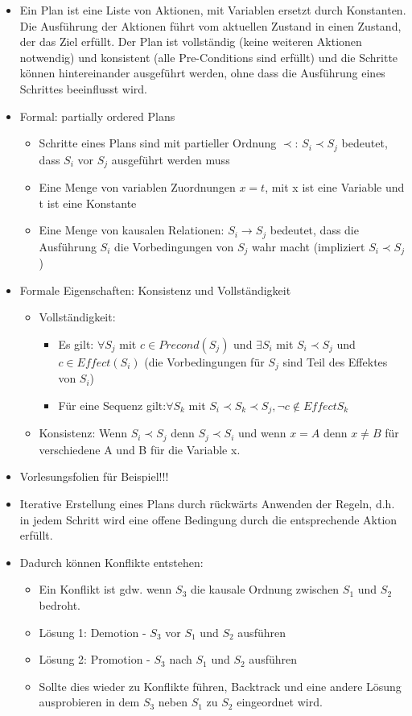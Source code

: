 \documentclass{article} %
\begin{document}
\begin{itemize}
\begin{itemize}
		\end{itemize}
		\item Ein Plan ist eine Liste von Aktionen, mit Variablen ersetzt durch Konstanten. Die Ausführung der Aktionen führt vom aktuellen Zustand in einen Zustand, der das Ziel erfüllt. Der Plan ist vollständig (keine weiteren Aktionen notwendig) und konsistent (alle Pre-Conditions sind erfüllt) und die Schritte können hintereinander ausgeführt werden, ohne dass die Ausführung eines Schrittes beeinflusst wird.
		\item Formal: partially ordered Plans
		\begin{itemize}
			\item Schritte eines Plans sind mit partieller Ordnung $\prec$: $S_{i} \prec S_{j}$ bedeutet, dass $S_{i}$ vor $S_{j}$ ausgeführt werden muss
			\item Eine Menge von variablen Zuordnungen $x=t$, mit x ist eine Variable und t ist eine Konstante
			\item Eine Menge von kausalen Relationen: $S_{i} \rightarrow S_{j}$ bedeutet, dass die Ausführung $S_{i}$ die Vorbedingungen von $S_{j}$ wahr macht (impliziert  $S_{i} \prec S_{j}$)
		\end{itemize}
		\item Formale Eigenschaften: Konsistenz und Vollständigkeit
		\begin{itemize}
			\item Vollständigkeit: 
			\begin{itemize}
				\item Es gilt: $\forall S_{j}$ mit $c\in Precond(S_{j})$ und $\exists S_{i}$ mit $S_{i} \prec S_{j}$ und $c\in Effect(S_{i})$ (die Vorbedingungen für $S_{j}$ sind Teil des Effektes von $S_{i}$)
				\item Für eine Sequenz gilt:$\forall S_{k}$ mit $S_{i} \prec S_{k} \prec S_{j}, \neg c \notin Effect S_{k}$
			\end{itemize} 
			\item Konsistenz: Wenn $S_{i} \prec S_{j}$ denn $S_{j} \prec S_{i}$ und wenn $x=A$ denn $x \neq B$ für verschiedene A und B für die Variable x.
		\end{itemize}
		\item Vorlesungsfolien für Beispiel!!!
		\item Iterative Erstellung eines Plans durch rückwärts Anwenden der Regeln, d.h. in jedem Schritt wird eine offene Bedingung durch die entsprechende Aktion erfüllt.
		\item Dadurch können Konflikte entstehen:
		\begin{itemize}
			\item Ein Konflikt ist gdw. wenn $S_{3}$ die kausale Ordnung zwischen $S_{1}$ und $S_{2}$ bedroht.
			\item Lösung 1: Demotion - $S_{3}$ vor $S_{1}$ und $S_{2}$ ausführen
			\item Lösung 2: Promotion - $S_{3}$ nach $S_{1}$ und $S_{2}$ ausführen
			\item Sollte dies wieder zu Konflikte führen, Backtrack und eine andere Lösung ausprobieren in dem $S_{3}$ neben $S_{1}$ zu $S_{2}$ eingeordnet wird.
		\end{itemize}
	\end{itemize}
\end{document}
